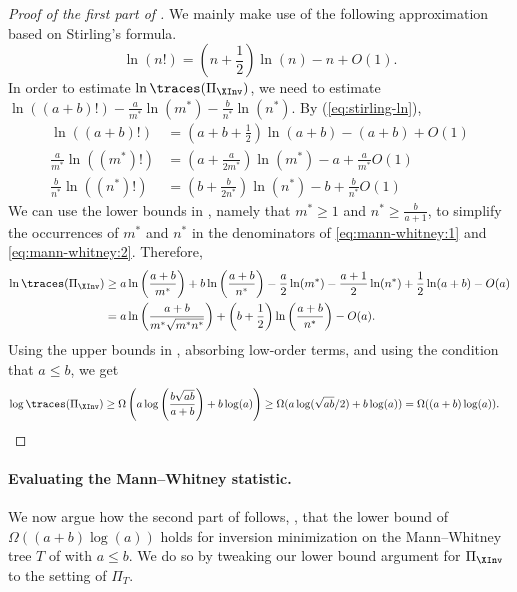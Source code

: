 \documentclass{toc}
\begin{document}
\begin{proof}[Proof of the first part of ]
We mainly make use of the following approximation based on Stirling's formula.
    \begin{equation}
        \label{eq:stirling-ln}
        \ln(n!) = \left(n+\frac{1}{2}\right)\ln(n)-n+O(1).
    \end{equation}
    In order to estimate $\ln \traces(\Pi_{\XInv})$, we need to estimate $\ln((a+b)!)-\frac{a}{m^*}\ln(m^*)-\frac{b}{n^*}\ln(n^*)$. By (\ref{eq:stirling-ln}),
    \begin{align}
        \ln((a+b)!) &= \left(a+b+\frac{1}{2}\right)\ln(a+b) - (a+b) + O(1)\\
        \frac{a}{m^*}\ln((m^*)!) &= \left(a+\frac{a}{2m^*}\right)\ln(m^*) - a + \frac{a}{m^*}O(1) \label{eq:mann-whitney:1}\\
        \frac{b}{n^*}\ln((n^*)!) &= \left(b+\frac{b}{2n^*}\right)\ln(n^*) - b + \frac{b}{n^*}O(1) \label{eq:mann-whitney:2}
    \end{align}
    We can use the lower bounds in , namely that $m^*\ge 1$ and $n^*\ge \frac{b}{a+1}$, to simplify the occurrences of $m^*$ and $n^*$ in the denominators of \eqref{eq:mann-whitney:1} and \eqref{eq:mann-whitney:2}. Therefore,
    \begin{align*}
        \ln \traces(\Pi_{\XInv}) &\ge a\ln\left(\frac{a+b}{m^*}\right)+b\ln\left(\frac{a+b}{n^*}\right) - \frac{a}{2}\ln(m^*) - \frac{a+1}{2}\ln(n^*) + \frac{1}{2}\ln(a+b) - O(a)\\
        &= a\ln\left(\frac{a+b}{m^*\sqrt{m^*n^*}}\right)+\left(b+\frac{1}{2}\right)\ln\left(\frac{a+b}{n^*}\right)- O(a).
    \end{align*}
    Using the upper bounds in , absorbing low-order terms, and using the condition that $a \le b$, we get
    \begin{align*}
        \log \traces(\Pi_{\XInv}) &\ge \Omega\left(a \log\left(\frac{b\sqrt{ab}}{a+b}\right) + b \log(a)\right) \ge \Omega(a \log(\sqrt{ab}/2) + b \log(a)) = 
        \Omega((a+b)\log(a)).
    \end{align*}
\end{proof}

\paragraph{Evaluating the Mann--Whitney statistic.} 
We now argue how the second part of  follows, \ie, that the lower bound of $\Omega((a+b)\log(a))$ holds for inversion minimization on the Mann--Whitney tree $T$ of  with $a \le b$. We do so by tweaking our lower bound argument for $\Pi_{\XInv}$ to the setting of $\Pi_T$.
\end{document}
